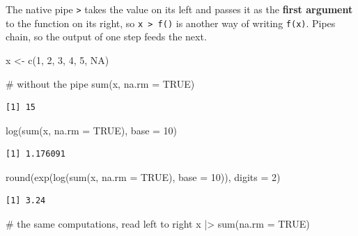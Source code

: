 \documentclass[
  letterpaper,
  DIV=11,
  numbers=noendperiod]{scrreprt}
\newenvironment{Shaded}{\begin{snugshade}}{\end{snugshade}}
\newcommand{\AttributeTok}[1]{\textcolor[rgb]{0.40,0.45,0.13}{#1}}
\newcommand{\CommentTok}[1]{\textcolor[rgb]{0.37,0.37,0.37}{#1}}
\newcommand{\ConstantTok}[1]{\textcolor[rgb]{0.56,0.35,0.01}{#1}}
\newcommand{\DecValTok}[1]{\textcolor[rgb]{0.68,0.00,0.00}{#1}}
\newcommand{\FunctionTok}[1]{\textcolor[rgb]{0.28,0.35,0.67}{#1}}
\newcommand{\NormalTok}[1]{\textcolor[rgb]{0.00,0.23,0.31}{#1}}
\newcommand{\OtherTok}[1]{\textcolor[rgb]{0.00,0.23,0.31}{#1}}
\newcommand{\SpecialCharTok}[1]{\textcolor[rgb]{0.37,0.37,0.37}{#1}}
\renewcommand{\[}{\begin{equation}}
\renewcommand{\]}{\end{equation}}
\begin{document}
The native pipe \texttt{\textbar{}\textgreater{}} takes the value on its
left and passes it as the \textbf{first argument} to the function on its
right, so \texttt{x\ \textbar{}\textgreater{}\ f()} is another way of
writing \texttt{f(x)}. Pipes chain, so the output of one step feeds the
next.

\begin{Shaded}
\begin{Highlighting}[]
\NormalTok{x }\OtherTok{\textless{}{-}} \FunctionTok{c}\NormalTok{(}\DecValTok{1}\NormalTok{, }\DecValTok{2}\NormalTok{, }\DecValTok{3}\NormalTok{, }\DecValTok{4}\NormalTok{, }\DecValTok{5}\NormalTok{, }\ConstantTok{NA}\NormalTok{)}

\CommentTok{\# without the pipe}
\FunctionTok{sum}\NormalTok{(x, }\AttributeTok{na.rm =} \ConstantTok{TRUE}\NormalTok{)}
\end{Highlighting}
\end{Shaded}

\begin{verbatim}
[1] 15
\end{verbatim}

\begin{Shaded}
\begin{Highlighting}[]
\FunctionTok{log}\NormalTok{(}\FunctionTok{sum}\NormalTok{(x, }\AttributeTok{na.rm =} \ConstantTok{TRUE}\NormalTok{), }\AttributeTok{base =} \DecValTok{10}\NormalTok{)}
\end{Highlighting}
\end{Shaded}

\begin{verbatim}
[1] 1.176091
\end{verbatim}

\begin{Shaded}
\begin{Highlighting}[]
\FunctionTok{round}\NormalTok{(}\FunctionTok{exp}\NormalTok{(}\FunctionTok{log}\NormalTok{(}\FunctionTok{sum}\NormalTok{(x, }\AttributeTok{na.rm =} \ConstantTok{TRUE}\NormalTok{), }\AttributeTok{base =} \DecValTok{10}\NormalTok{)), }\AttributeTok{digits =} \DecValTok{2}\NormalTok{)}
\end{Highlighting}
\end{Shaded}

\begin{verbatim}
[1] 3.24
\end{verbatim}

\begin{Shaded}
\begin{Highlighting}[]
\CommentTok{\# the same computations, read left to right}
\NormalTok{x }\SpecialCharTok{|\textgreater{}} \FunctionTok{sum}\NormalTok{(}\AttributeTok{na.rm =} \ConstantTok{TRUE}\NormalTok{)}
\end{Highlighting}
\end{Shaded}
\end{document}
